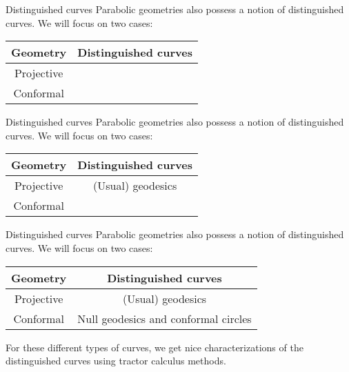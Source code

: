 \documentclass{beamer}
\begin{document}
\begin{frame}{Distinguished curves}
  Parabolic geometries also possess a notion of distinguished curves.
  We will focus on two cases: \\
  \begin{center}
    \begin{tabular}{ | c | c | }
      \hline
      Geometry & Distinguished curves \\ \hline
      Projective & \phantom{(Usual) geodesics} \\ \hline 
      Conformal & \phantom{Null geodesics and conformal circles} \\
      \hline
    \end{tabular}
  \end{center}
  \phantom{For these different types of curves, we get nice characterizations of the distinguished curves using tractor calculus methods.}
\end{frame}

\begin{frame}{Distinguished curves}
  Parabolic geometries also possess a notion of distinguished curves.
  We will focus on two cases: \\
  \begin{center}
    \begin{tabular}{ | c | c | }
      \hline
      Geometry & Distinguished curves \\ \hline
      Projective & (Usual) geodesics \\ \hline 
      Conformal & \phantom{Null geodesics and conformal circles} \\
      \hline
    \end{tabular}
  \end{center}
  \phantom{For these different types of curves, we get nice characterizations of the distinguished curves using tractor calculus methods.}
\end{frame}

\begin{frame}{Distinguished curves}
  Parabolic geometries also possess a notion of distinguished curves.
  We will focus on two cases: \\
  \begin{center}
    \begin{tabular}{ | c | c | }
      \hline
      Geometry & Distinguished curves \\ \hline
      Projective & (Usual) geodesics \\ \hline 
      Conformal & Null geodesics and conformal circles \\
      \hline
    \end{tabular}
  \end{center}
  \pause 
  For these different types of curves, we get nice characterizations of the distinguished curves using tractor calculus methods.
\end{frame}
\end{document}
